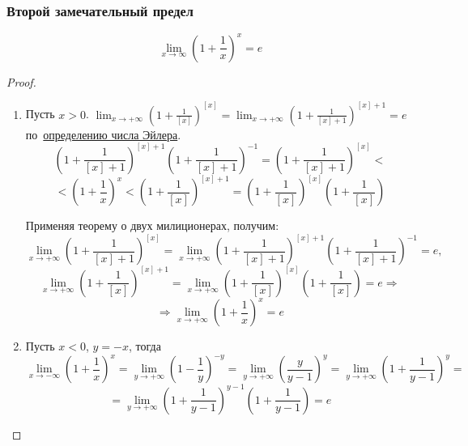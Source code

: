 \subsubsection{Второй замечательный предел}
\begin{statement}
\begin{equation*}
\lim_{x \to \infty} \left( 1 + \frac1x \right)^x = e
\end{equation*}
\end{statement}
\begin{proof}
\begin{enumerate}
	\item Пусть $x > 0$.
	$\displaystyle \lim_{x \to +\infty} \left( 1 + \frac1{[x]} \right)^{[x]} = \lim_{x \to +\infty} \left( 1 + \frac1{[x] + 1} \right)^{[x] + 1} = e$ по~\hyperlink{def:Euler's_number}{определению числа Эйлера}.
	\begin{equation*}
	\left( 1 + \frac1{[x] + 1} \right)^{[x] + 1} \left( 1 + \frac1{[x] + 1} \right)^{-1} =
	\left( 1 + \frac1{[x] + 1} \right)^{[x]} <
	\end{equation*}
	\begin{equation*}
	< \left( 1 + \frac1x \right)^x <
	\left( 1 + \frac1{[x]} \right)^{[x] + 1} =
	\left( 1 + \frac1{[x]} \right)^{[x]} \left( 1 + \frac1{[x]} \right)
	\end{equation*}
	
	Применяя теорему о двух милиционерах, получим:
	\begin{equation*}
	\lim_{x \to +\infty} \left( 1 + \frac1{[x] + 1} \right)^{[x]} =
	\lim_{x \to +\infty} \left( 1 + \frac1{[x] + 1} \right)^{[x] + 1} \left( 1 + \frac1{[x] + 1} \right)^{-1} = e,
	\end{equation*}
	\begin{equation*}
	\lim_{x \to +\infty} \left( 1 + \frac1{[x]} \right)^{[x] + 1} =
	\lim_{x \to +\infty} \left( 1 + \frac1{[x]} \right)^{[x]} \left( 1 + \frac1{[x]} \right) = e \Rightarrow
	\end{equation*}
	\begin{equation*}
	\Rightarrow \lim_{x \to +\infty} \left( 1 + \frac1x \right)^x = e
	\end{equation*}
	
	\item Пусть $x < 0$, $y = -x$, тогда
	\begin{equation*}
	\lim_{x \to -\infty} \left( 1 + \frac1x \right)^x =
	\lim_{y \to +\infty} \left( 1 - \frac1y \right)^{-y} =
	\lim_{y \to +\infty} \left( \frac{y}{y - 1} \right)^y =
	\lim_{y \to +\infty} \left( 1 + \frac1{y - 1} \right)^y =
	\end{equation*}
	\begin{equation*}
	= \lim_{y \to +\infty} \left( 1 + \frac1{y - 1} \right)^{y-1} \left( 1 + \frac1{y - 1} \right) = e
	\end{equation*}
\end{enumerate}
\end{proof}

